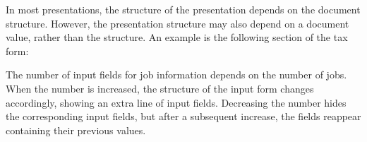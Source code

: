 In most presentations, the structure of the presentation depends on the document structure. However, the presentation structure may also depend on a document value, rather than the structure. An example is the following section of the tax form:


The number of input fields for job information depends on the number of jobs. When the number is increased, the structure of the input form changes accordingly, showing an extra line of input fields. Decreasing the number hides the corresponding input fields, but after a subsequent increase, the fields reappear containing their previous values.

